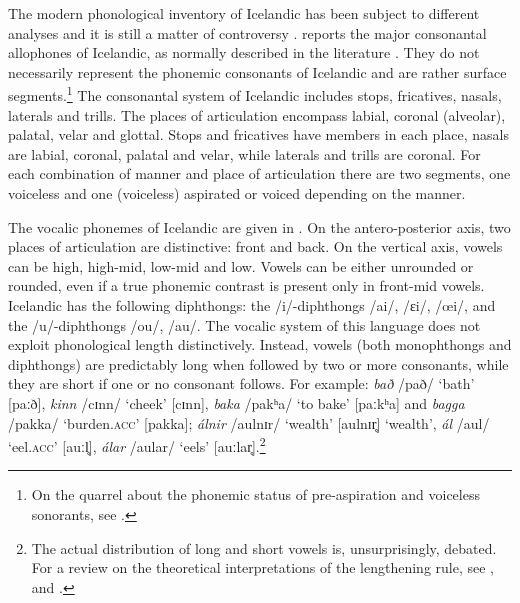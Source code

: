 \documentclass[11pt,a4paper,openany]{memoir}\usepackage[]{graphicx}\usepackage[]{color}
\begin{document}
The modern phonological inventory of Icelandic has been subject to different analyses and it is still a matter of controversy \citep{thraisson1978,jessen1998,arnason2011}.
 reports the major consonantal allophones of Icelandic, as normally described in the literature \citep[98]{arnason2011}.
They do not necessarily represent the phonemic consonants of Icelandic and are rather surface segments.\footnote{
On the quarrel about the phonemic status of pre-aspiration and voiceless sonorants, see \citet{thraisson1978,jessen1998,berg2001,hansson2003,bombien2006}.
}
The consonantal system of Icelandic includes stops, fricatives, nasals, laterals and trills.
The places of articulation encompass labial, coronal (alveolar), palatal, velar and glottal.
Stops and fricatives have members in each place, nasals are labial, coronal, palatal and velar, while laterals and trills are coronal.
For each combination of manner and place of articulation there are two segments, one voiceless and one (voiceless) aspirated or voiced depending on the manner.

The vocalic phonemes of Icelandic are given in  \citep[60]{arnason2011}.
On the antero-posterior axis, two places of articulation are distinctive: front and back.
On the vertical axis, vowels can be high, high-mid, low-mid and low.
Vowels can be either unrounded or rounded, even if a true phonemic contrast is present only in front-mid vowels.
Icelandic has the following diphthongs: the /i/-diphthongs /ai/, /ɛi/, /œi/, and the /u/-diphthongs /ou/, /au/.
The vocalic system of this language does not exploit phonological length distinctively.
Instead, vowels (both monophthongs and diphthongs) are predictably long when followed by two or more consonants, while they are short if one or no consonant follows.
For example: \textit{bað} /pað/ `bath' [paːð], \textit{kinn} /cɪnn/ `cheek' [cɪnn], \textit{baka} /pakʰa/  `to bake' [paːkʰa] and \textit{bagga} /pakka/ `burden.\textsc{acc}' [pakka]; \textit{álnir} /aulnɪr/ `wealth' [aulnɪr̥] ‘wealth’, \textit{ál} /aul/ `eel.\textsc{acc}' [auːl̥], \textit{álar} /aular/ `eels' [auːlar̥].\footnote{The actual distribution of long and short vowels is, unsurprisingly, debated.
For a review on the theoretical interpretations of the lengthening rule, see \citet{booij1986,pind1999}, and \citet[160--173, 203--208]{arnason2011}.
}

\end{document}
